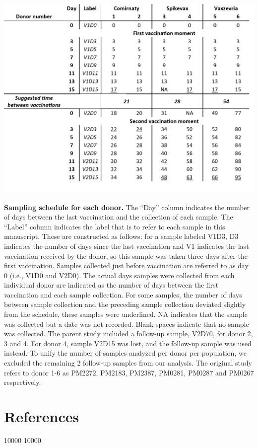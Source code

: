 \begin{subappendices}
\begin{figure}[!htb]
    \label{fig:figs4.3}
  \end{figure}
  \begin{table}[!hbt]
    \includegraphics[]{Chapter.4/Figures/ts1.png}
    \caption{
      \textbf{Sampling schedule for each donor.} The “Day” column indicates the number of days between the last vaccination and the collection of each sample. The “Label” column indicates the label that is to refer to each sample in this manuscript. These are constructed as follows: for a sample labeled V1D3, D3 indicates the number of days since the last vaccination and V1 indicates the last vaccination received by the donor, so this sample was taken three days after the first vaccination. Samples collected just before vaccination are referred to as day 0 (i.e., V1D0 and V2D0). The actual days samples were collected from each individual donor are indicated as the number of days between the first vaccination and each sample collection. For some samples, the number of days between sample collection and the preceding sample collection deviated slightly from the schedule, these samples were underlined. NA indicates that the sample was collected but a date was not recorded. Blank spaces indicate that no sample was collected. The parent study included a follow-up sample, V2D70, for donor 2, 3 and 4. For donor 4, sample V2D15 was lost, and the follow-up sample was used instead. To unify the number of samples analyzed per donor per population, we excluded the remaining 2 follow-up samples from our analysis. The original study refers to donor 1-6 as PM2272, PM2183, PM2387, PM0281, PM0287 and PM0267 respectively.
    }
    \label{tab:tabs4.1}
  \end{table}

\end{subappendices}

\clearpage
\section*{References}

\patchcmd{\thebibliography}
{}
{ 10000  10000}
{}{}

\stopthumb



